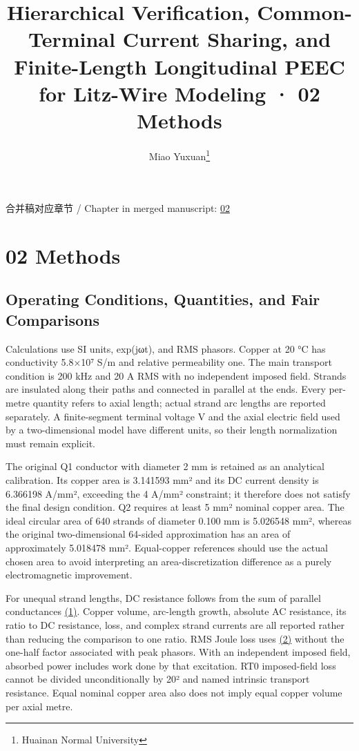 \documentclass[journal,10pt]{IEEEtran}
\begin{document}
\title{Hierarchical Verification, Common-Terminal Current Sharing, and Finite-Length Longitudinal PEEC for Litz-Wire Modeling · 02 Methods}
\author{Miao Yuxuan\thanks{Huainan Normal University}}

\maketitle
\noindent 合并稿对应章节 / Chapter in merged manuscript: \href{paper_en_ieee.pdf#chapter-02}{02}\par
\FloatBarrier
\section*{02 Methods}
\hypertarget{chapter-02}{}
\subsection*{Operating Conditions, Quantities, and Fair Comparisons}
\hypertarget{02.conventions.heading}{}
Calculations use SI units, exp(jωt), and RMS phasors. Copper at 20 °C has conductivity 5.8×10⁷ S/m and relative permeability one. The main transport condition is 200 kHz and 20 A RMS with no independent imposed field. Strands are insulated along their paths and connected in parallel at the ends. Every per-metre quantity refers to axial length; actual strand arc lengths are reported separately. A finite-segment terminal voltage V and the axial electric field used by a two-dimensional model have different units, so their length normalization must remain explicit.


The original Q1 conductor with diameter 2 mm is retained as an analytical calibration. Its copper area is 3.141593 mm² and its DC current density is 6.366198 A/mm², exceeding the 4 A/mm² constraint; it therefore does not satisfy the final design condition. Q2 requires at least 5 mm² nominal copper area. The ideal circular area of 640 strands of diameter 0.100 mm is 5.026548 mm², whereas the original two-dimensional 64-sided approximation has an area of approximately 5.018478 mm². Equal-copper references should use the actual chosen area to avoid interpreting an area-discretization difference as a purely electromagnetic improvement.


For unequal strand lengths, DC resistance follows from the sum of parallel conductances \href{paper_en_ieee.pdf#E01}{(1)}. Copper volume, arc-length growth, absolute AC resistance, its ratio to DC resistance, loss, and complex strand currents are all reported rather than reducing the comparison to one ratio. RMS Joule loss uses \href{paper_en_ieee.pdf#E02}{(2)} without the one-half factor associated with peak phasors. With an independent imposed field, absorbed power includes work done by that excitation. RT0 imposed-field loss cannot be divided unconditionally by 20² and named intrinsic transport resistance. Equal nominal copper area also does not imply equal copper volume per axial metre.
\end{document}
